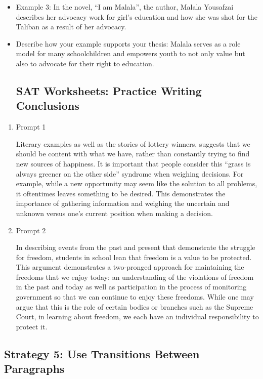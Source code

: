 \begin{enumerate}
\begin{enumerate}
\begin{itemize}
\item Example 3: In the novel, ``I am Malala'', the author, Malala Yousafzai describes her advocacy work for girl’s education and how she was shot for the Taliban as a result of her advocacy. 
\item Describe how your example supports your thesis: Malala serves as a role model for many schoolchildren and empowers youth to not only value but also to advocate for their right to education. 
\subsection{SAT Worksheets: Practice Writing Conclusions}

\end{itemize}
\end{enumerate}

\begin{enumerate}

\item Prompt 1

\bigskip
Literary examples as well as the stories of lottery winners, suggests that we should be content with what we have, rather than constantly trying to find new sources of happiness. It is important that people consider this ``grass is always greener on the other side'' syndrome when weighing decisions. For example, while a new opportunity may seem like the solution to all problems, it oftentimes leaves something to be desired. This demonstrates the importance of gathering information and weighing the uncertain and unknown versus one's current position when making a decision. 

\item Prompt 2

\bigskip
In describing events from the past and present that demonstrate the struggle for freedom, students in school lean that freedom is a value to be protected. This argument demonstrates a two-pronged approach for maintaining the freedoms that we enjoy today: an understanding of the violations of freedom in the past and today as well as participation in the process of monitoring government so that we can continue to enjoy these freedoms. While one may argue that this is the role of certain bodies or branches such as the Supreme Court, in learning about freedom, we each have an individual responsibility to protect it. 

\end{enumerate} 

\subsection{Strategy 5: Use Transitions Between Paragraphs}


\end{enumerate}
